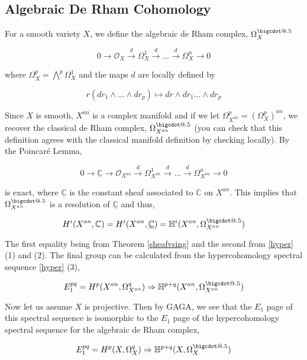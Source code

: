 \documentclass[a4paper]{article}
\makeatletter
\newcommand{\C}{\mathbb{C}}
\newcommand*\bigcdot{\mathpalette\bigcdot@{.5}}
\newcommand*\bigcdot@[2]{\mathbin{\vcenter{\hbox{\scalebox{#2}{$\m@th#1\bullet$}}}}}
\numberwithin{theorem}{section}
\numberwithin{equation}{section}
\makeatother
\begin{document}
\subsection{Algebraic De Rham Cohomology} \label{alg}

For a smooth variety $X$, we define the algebraic de Rham complex, $\Omega_X^{\bigcdot}$

$$ 0 \rightarrow \mathcal{O}_X \overset{d}{\rightarrow} \Omega_X^1 \overset{d}{\rightarrow} \dots \overset{d}{\rightarrow} \Omega_X^n \rightarrow 0 $$

where $\Omega_X^p = \bigwedge^p \Omega_X^1$ and the maps $d$ are locally defined by

$$ r (dr_1 \wedge \dots \wedge dr_p) \mapsto dr \wedge dr_1 \dots \wedge dr_p$$

Since $X$ is smooth, $X^{an}$ is a complex manifold and if we let $\Omega_{X^{an}}^p = (\Omega_X^p)^{an}$, we recover the classical de Rham complex, $\Omega_{X^{an}}^{\bigcdot}$ (you can check that this definition agrees with the classical manifold definition by checking locally). By the Poincaré Lemma,

$$ 0 \rightarrow \underline{\C} \rightarrow \mathcal{O}_{X^{an}} \overset{d}{\rightarrow} \Omega_{X^{an}}^1 \overset{d}{\rightarrow} \dots \overset{d}{\rightarrow} \Omega_{X^{an}}^n \rightarrow 0 $$

is exact, where $\underline{\C}$ is the constant sheaf associated to $\C$ on $X^{an}$. This implies that $\Omega_{X^{an}}^{\bigcdot}$ is a resolution of $\underline{\C}$ and thus,

$$ H^i(X^{an},\C) = H^i(X^{an},\underline{\C}) = \mathbb{H}^i(X^{an},\Omega_{X^{an}}^{\bigcdot}) $$

The first equality being from Theorem \ref{sheafvsing} and the second from \ref{hyper} (1) and (2). The final group can be calculated from the hypercohomology spectral sequence \ref{hyper} (3),

\begin{equation} \label{specseq}
    E_1^{pq} = H^p(X^{an},\Omega_{X^{an}}^q) \Rightarrow \mathbb{H}^{p+q}(X^{an},\Omega_{X^{an}}^{\bigcdot})
\end{equation}

Now let us assume $X$ is projective. Then by GAGA, we see that the $E_1$ page of this spectral sequence is isomorphic to the $E_1$ page of the hypercohomology spectral sequence for the algebraic de Rham complex,

$$ E_1^{pq} = H^p(X,\Omega_{X}^q) \Rightarrow \mathbb{H}^{p+q}(X,\Omega_{X}^{\bigcdot}) $$
\end{document}
